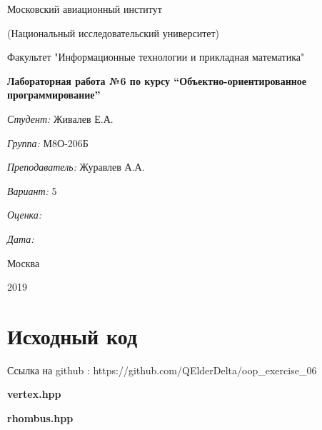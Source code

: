 \documentclass[a4paper, 12pt]{article}
\begin{document}
\thispagestyle{empty}	
\begin{center}
	Московский авиационный институт
	
	(Национальный исследовательский университет)
	
	Факультет "Информационные технологии и прикладная математика"
	
\end{center}
\vspace{40ex}
\begin{center}
	\textbf{\large{Лабораторная работа №6 по курсу \textquotedblleft Объектно-ориентированное программирование\textquotedblright}}
\end{center}
\vspace{40ex}
\begin{flushright}
	\textit{Студент: } Живалев Е.А.
	
	\vspace{2ex}
	\textit{Группа: } М8О-206Б
	
	\vspace{2ex}
	\textit{Преподаватель: } Журавлев А.А.
	
	\vspace{2ex}
	\textit{Вариант: } 5
	
	\vspace{2ex}
	\textit{Оценка: } \underline{\quad\quad\quad\quad\quad\quad}
	
	 \vspace{2ex}
	\textit{Дата: } \underline{\quad\quad\quad\quad\quad\quad}
	
\end{flushright}

\begin{vfill}
	\begin{center}
		Москва
		
		2019
	\end{center}	
\end{vfill}
\newpage
\section{Исходный код}

Ссылка на github : https://github.com/QElderDelta/oop\_exercise\_06

\vspace{3ex}
\textbf{\large{vertex.hpp}}


\vspace{3ex}
\textbf{\large{rhombus.hpp}}

\end{document}
